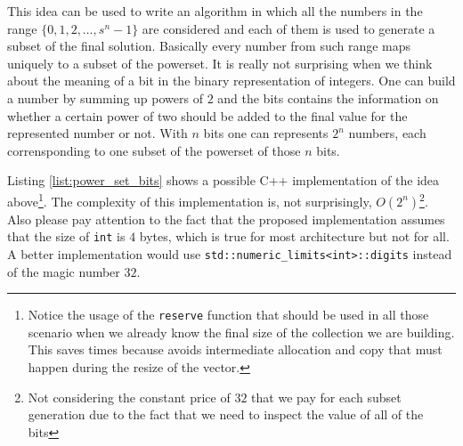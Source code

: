 This idea can be used to write an algorithm in which all the numbers in the range $\{0,1,2,\ldots,
s^n-1\}$ are considered and each of them is used to generate a subset of the final solution.
Basically every number from such range maps uniquely to a subset of the powerset. It is really not
surprising when we think about the meaning of a bit in the binary representation of integers. One
can build a number by summing up powers of $2$ and the bits contains the information on whether a
certain power of two should be added to the final value for the represented number or not. With $n$
bits one can represents $2^n$ numbers, each corrensponding to one subset of the powerset of those
$n$ bits.

Listing \ref{list:power_set_bits} shows  a possible C++ implementation of the idea above\footnote{Notice the usage of the \texttt{reserve}
function that should be used in all those scenario when we already know the final size of the
collection we are building. This saves times because avoids intermediate allocation and copy that
must happen during the resize of the vector.}. The complexity of this implementation is, not
surprisingly, $O(2^n)$\footnote{Not considering the constant price of $32$ that we pay for each
subset generation due to the fact that we need to inspect the value of all of the bits}. Also please
pay attention to the fact that the proposed implementation assumes that the size of
\lstinline[columns=fixed]{int} is $4$ bytes, which is true for most architecture but not for all\cite{cit::std::fundamentaltypes}. A better
implementation would use \lstinline[columns=fixed]{std::numeric_limits<int>::digits} instead of
the magic number $32$.



	



